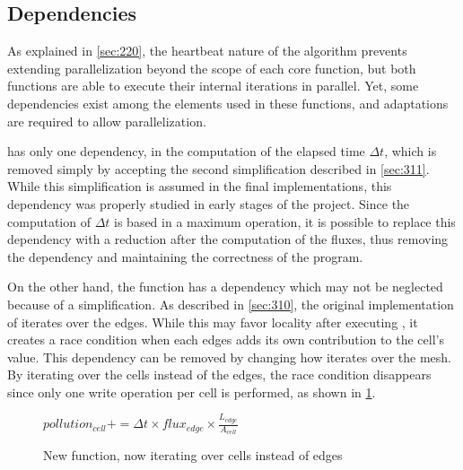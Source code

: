 \subsection{Dependencies}
\label{sec:dependencies}



As explained in \cref{sec:220}, the heartbeat nature of the algorithm prevents extending parallelization beyond the scope of each core function, but both functions are able to execute their internal iterations in parallel.
Yet, some dependencies exist among the elements used in these functions, and adaptations are required to allow parallelization.

\computeflux has only one dependency, in the computation of the elapsed time $\Delta t$, which is removed simply by accepting the second simplification described in \cref{sec:311}.
While this simplification is assumed in the final implementations, this dependency was properly studied in early stages of the project.
Since the computation of $\Delta t$ is based in a maximum operation, it is possible to replace this dependency with a reduction after the computation of the fluxes, thus removing the dependency and maintaining the correctness of the program.

On the other hand, the \update function has a dependency which may not be neglected because of a simplification.
As described in \cref{sec:310}, the original implementation of \update iterates over the edges.
While this may favor locality after executing \computeflux, it creates a race condition when each edges adds its own contribution to the cell's value.
This dependency can be removed by changing how \update iterates over the mesh. By iterating over the cells instead of the edges, the race condition disappears since only one write operation per cell is performed, as shown in \cref{alg:update2}.

\begin{figure}[!htp]
	\begin{alg}
				\State $pollution_{cell} += \Delta{t} \times flux_{edge} \times \frac{L_{edge}}{A_{cell}}$
			\EndFor
		\EndFor
	\end{alg}

	\caption{New \update function, now iterating over cells instead of edges}
	\label{alg:update2}
\end{figure}
